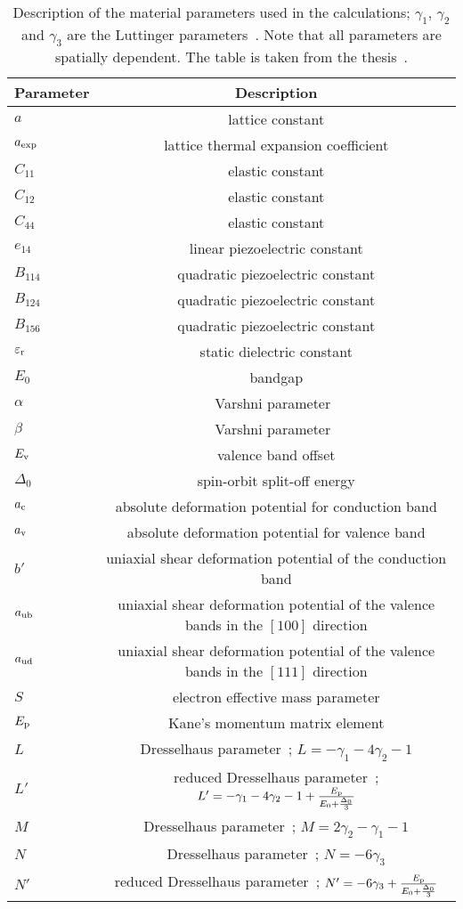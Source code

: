 \begin{table}[!ht]
	\begin{tabular}{lc}
		\hline \hline
		Parameter & Description\\
		\hline
		$a$& lattice constant\\
		$a_{\rm exp}$& lattice thermal expansion coefficient\\
		$C_{11}$& elastic constant\\
		$C_{12}$& elastic constant\\
		$C_{44}$& elastic constant\\
		$e_{14}$& linear piezoelectric constant\\
		$B_{114}$& quadratic piezoelectric constant\\
		$B_{124}$& quadratic piezoelectric constant\\
		$B_{156}$& quadratic piezoelectric constant\\
		$\varepsilon_{\rm r}$& static dielectric constant\\
		$E_0$& bandgap\\
		$\alpha$& Varshni parameter~\citep{Varshni}\\
		$\beta$& Varshni parameter~\citep{Varshni}\\
		$E_{\rm v}$& valence band offset\\
		$\Delta_0$& spin-orbit split-off energy\\
		$a_{\rm c}$& absolute deformation potential for conduction band\\
		$a_{\rm v}$& absolute deformation potential for valence band\\
		$b'$& uniaxial shear deformation potential of the conduction band\\
		$a_{\rm ub}$& uniaxial shear deformation potential of the valence bands  in the $[100]$ direction\\
		$a_{\rm ud}$& uniaxial shear deformation potential of the valence bands in the $[111]$ direction\\
		$S$& electron effective mass parameter\\
		$E_{\rm p}$& Kane's momentum matrix element\\
		$L$& Dresselhaus parameter~\citep{Dress}; $L=-\gamma_1-4\gamma_2-1$\\
		$L'$& reduced Dresselhaus parameter~\citep{Dress}; $L'=- \gamma_1 - 4\gamma_2 - 1 + \frac{E_{\rm p}}{E_0+\frac{\Delta_0}{3}}$\\
		$M$& Dresselhaus parameter~\citep{Dress}; $M=2\gamma_2 - \gamma_1  - 1$\\
		$N$& Dresselhaus parameter~\citep{Dress}; $N=-6\gamma_3$\\
		$N'$& reduced Dresselhaus parameter~\citep{Dress}; $N'=-6\gamma_3 + \frac{E_{\rm p}}{E_0+\frac{\Delta_0}{3}}$\\
		\hline \hline
	\end{tabular}
	\caption{Description of the material parameters used in the calculations; $\gamma_1$, $\gamma_2$ and $\gamma_3$ are the Luttinger parameters~\citep{Lutt}. Note that all parameters are spatially dependent. The table is taken from the thesis~\citep{t_klenovsky}. \label{tDesc}}
\end{table}


